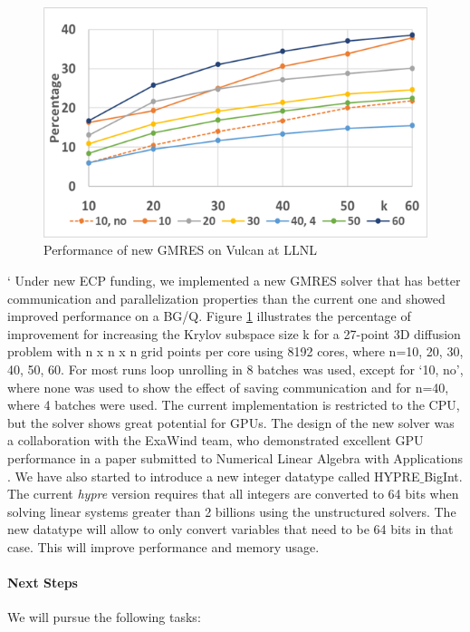 \begin{figure}
\centering
	\includegraphics[width=5in]{projects/2.3.3-MathLibs/2.3.3.01-xSDK/COGMRES.png}
	\caption{\label{fig:cogmres} Performance of new GMRES on Vulcan at LLNL}
\end{figure}
`
Under new ECP funding, we implemented a new GMRES solver that has better communication and parallelization properties than the current one and showed improved performance on a BG/Q. 
Figure \ref{fig:cogmres} illustrates the percentage of improvement for increasing the Krylov subspace size k for a 27-point 3D diffusion problem with n x n x n grid points per core using 8192 cores, where n=10, 20, 30, 40, 50, 60. 
For most runs loop unrolling in 8 batches was used, except for `10, no', where none was used to show the effect of saving communication and for n=40, where 4 batches were used. The current implementation is restricted to the CPU, but the solver shows great potential for GPUs. The design of the new solver was a collaboration with the ExaWind team, who demonstrated excellent GPU performance in a paper submitted to Numerical Linear Algebra with Applications \cite{cogmres}. 
We have also started to introduce a new integer datatype called HYPRE$\_$BigInt. The current {\sl hypre} version requires that all integers are converted to 64 bits when solving linear systems greater than 2 billions using the unstructured solvers. The new datatype will allow to only convert variables that need to be 64 bits in that case. This will improve performance and memory usage.

\paragraph{Next Steps}

We will pursue the following tasks:

